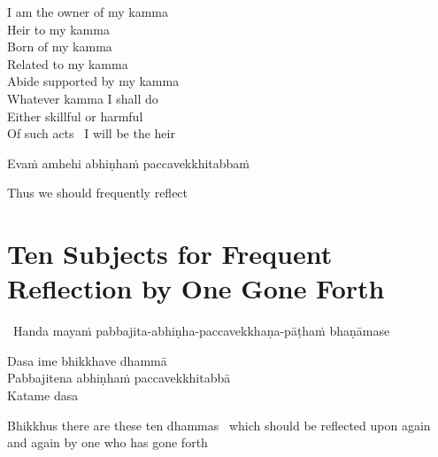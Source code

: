 \begin{english-verses}
  I am the owner of my kamma\\
  Heir to my kamma\\
  Born of my kamma\\
  Related to my kamma\\
  Abide supported by my kamma\\
  Whatever kamma I shall do\\
  Either skillful or harmful\\
  Of such acts \breathmark\ I will be the heir\makeatletter\hyperlink{endnote98-appendix}\makeatother
\end{english-verses}

Evaṁ amhehi abhiṇhaṁ paccavekkhitabbaṁ

\begin{english}
  Thus we should frequently reflect
\end{english}

\suttaRef{[AN 5.57]}


\section{Ten Subjects for Frequent Reflection by One Gone Forth}
\label{ten-reflections}

\begin{leader}
  \anglebracketleft\ \hspace{-0.5mm}Handa mayaṁ pabbajita-abhiṇha-paccavekkhaṇa-pāṭhaṁ bhaṇāmase \hspace{-0.5mm}\anglebracketright\
\end{leader}

Dasa ime bhikkhave dhammā\\
Pabbajitena abhiṇhaṁ paccavekkhitabbā\\
Katame dasa

\begin{english-hang-verses}
  Bhikkhus there are these ten dhammas\makeatletter\hyperlink{endnote99-appendix}\makeatother
  \breathmark\ which should be reflected upon again and again by one who has gone forth\\
\end{english-hang-verses}

